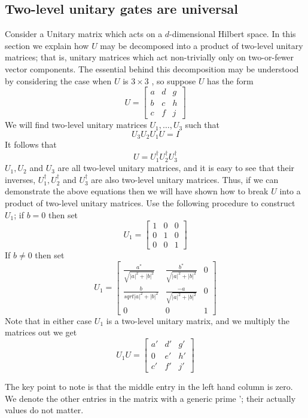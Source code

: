 \subsection{Two-level unitary gates are universal}
Consider a Unitary matrix which acts on a $d$-dimensional Hilbert space. In this section we explain how $U$ may be decomposed into a product of two-level unitary matrices; that is, unitary matrices which act non-trivially only on two-or-fewer vector components. The essential behind this decomposition may be understood by considering the case when $U$ is $3\times 3$ , so suppose $U$ has the form
\[
U=\begin{bmatrix} a & d & g \\ b & c & h \\ c & f & j \end{bmatrix}
\]
We will find two-level unitary matrices $U_1,\ldots,U_3$ such that
\[
U_3U_2U_1U=I
\]
It follows that
\[
U=U_1^{\dagger}U_2^{\dagger}U_3^{\dagger}
\]
$U_1,U_2$ and $U_3$ are all two-level unitary matrices, and it is easy to see that their inverses, $U_1^{\dagger},U_2^{\dagger}$ and $U_3^{\dagger}$ are also two-level unitary matrices. Thus, if we can demonstrate the above equations then we will have shown how to break $U$ into a product of two-level unitary matrices.
Use the following procedure to construct $U_1$; if $b=0$ then set
\[
U_1=\begin{bmatrix}
    1 & 0 & 0 \\ 0 & 1 & 0 \\ 0 & 0 & 1
\end{bmatrix}
\]
If $b\neq 0$ then set
\[
U_1 = \begin{bmatrix} \frac{a^*}{\sqrt{|a|^2+|b|^2}} & \frac{b^*}{\sqrt{|a|^2+|b|^2}}& 0 \\
\frac{b}{sqrt{|a|^2+|b|^2}} & \frac{-a}{\sqrt{|a|^2 + |b|^2}} & 0 \\ 0  & 0 & 1 \end{bmatrix}
\]
Note that in either case $U_1$ is a two-level unitary matrix, and we multiply the matrices out we get
\[
U_1U= \begin{bmatrix} a' & d' & g' \\ 0 & e' & h' \\ c' & f' & j' \end{bmatrix}
\]

The key point to note is that the middle entry in the left hand column is zero. We denote the other entries in the matrix with a generic prime '; their actually values do not matter.

